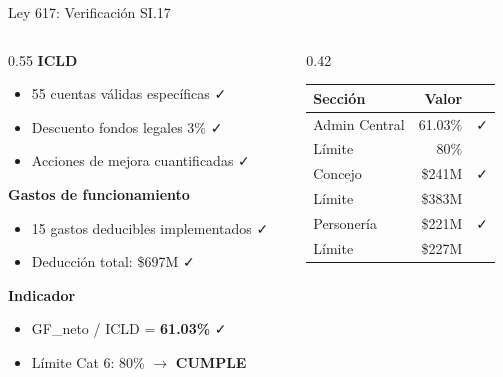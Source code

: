 \documentclass[aspectratio=169,11pt]{beamer}
\newcommand{\cmark}{\textcolor{verde}{\faCheck}}
\begin{document}
\begin{frame}{Ley 617: Verificaci\'on SI.17}
\footnotesize
\begin{columns}[T]
\begin{column}{0.55\textwidth}
\textbf{ICLD}
\begin{itemize}\setlength{\itemsep}{0pt}
    \item 55 cuentas v\'alidas espec\'ificas \cmark
    \item Descuento fondos legales 3\% \cmark
    \item Acciones de mejora cuantificadas \cmark
\end{itemize}

\vspace{4pt}
\textbf{Gastos de funcionamiento}
\begin{itemize}\setlength{\itemsep}{0pt}
    \item 15 gastos deducibles implementados \cmark
    \item Deducci\'on total: \$697M \cmark
\end{itemize}

\vspace{4pt}
\textbf{Indicador}
\begin{itemize}\setlength{\itemsep}{0pt}
    \item GF\_neto / ICLD = \textbf{61.03\%} \cmark
    \item L\'imite Cat 6: 80\% $\to$ \textbf{CUMPLE}
\end{itemize}
\end{column}
\begin{column}{0.42\textwidth}
\renewcommand{\arraystretch}{1.2}
\begin{tabular}{l r c}
\toprule
\textbf{Secci\'on} & \textbf{Valor} & \\
\midrule
Admin Central & 61.03\% & \cmark \\
L\'imite & 80\% & \\
\midrule
Concejo & \$241M & \cmark \\
L\'imite & \$383M & \\
\midrule
Personer\'ia & \$221M & \cmark \\
L\'imite & \$227M & \\
\bottomrule
\end{tabular}
\end{column}
\end{columns}
\end{frame}
\end{document}
